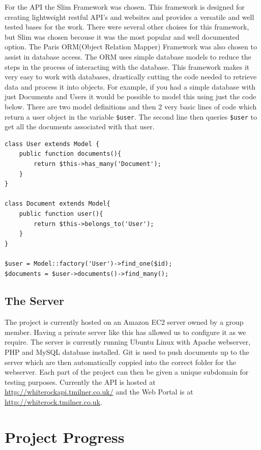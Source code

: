 \documentclass[11pt,a4paper]{article}
\begin{document}
For the API the Slim Framework\cite{slim} was chosen. This framework is designed for creating lightweight restful API's and websites and provides a versatile and well tested bases for the work. There were several other choises for this framework, but Slim was chosen becouse it was the most popular and well documented option. The Paris ORM(Object Relation Mapper) Framework\cite{paris} was also chosen to assist in database access. The ORM uses simple database models to reduce the steps in the process of interacting with the database. This framework makes it very easy to work with databases, drastically cutting the code needed to retrieve data and process it into objects. For example, if you had a simple database with just Documents and Users it would be possible to model this using just the code below. There are two model definitions and then 2 very basic lines of code which return a user object in the variable \lstinline{$user}. The second line then queries \lstinline{$user} to get all the documents associated with that user. \cite{TomMilestone2} 

\begin{lstlisting}
class User extends Model {
	public function documents(){
		return $this->has_many('Document');
	}
}

class Document extends Model{
	public function user(){
		return $this->belongs_to('User');
	}
}

$user = Model::factory('User')->find_one($id); 
$documents = $user->documents()->find_many();
\end{lstlisting}

\subsection{The Server}
The project is currently hosted on an Amazon EC2 server owned by a group member. Having a private server like this has allowed us to configure it as we require. The server is currently running Ubuntu Linux with Apache webserver, PHP and MySQL database installed. Git is used to push documents up to the server which are then automatically coppied into the correct folder for the webserver. Each part of the project can then be given a unique subdomain for testing purposes. Currently the API is hosted at \url{http://whiterockapi.tmilner.co.uk/} and the Web Portal is at \url{http://whiterock.tmilner.co.uk}.


\section{Project Progress}
\end{document}
